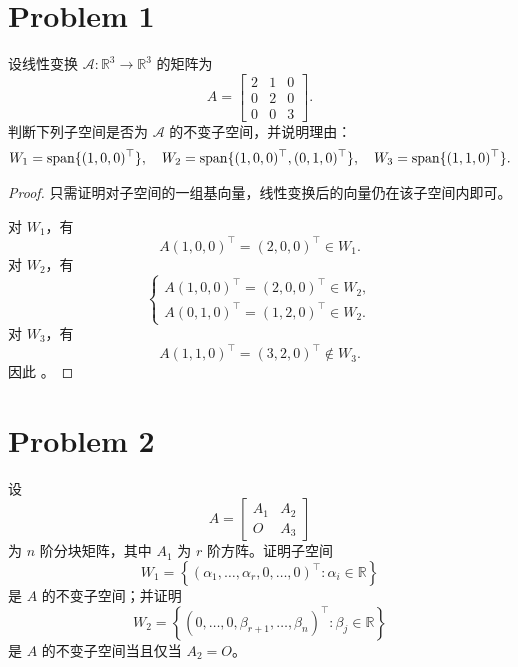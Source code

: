 \section*{Problem 1}

设线性变换 $\mathcal{A} : \mathbb{R}^3 \to \mathbb{R}^3$ 的矩阵为
\[
A =
\begin{bmatrix}
2 & 1 & 0 \\
0 & 2 & 0 \\
0 & 0 & 3
\end{bmatrix}.
\]
判断下列子空间是否为 $\mathcal{A}$ 的不变子空间，并说明理由：
\[
W_1 = \mathrm{span}\{(1,0,0)^\top\},\quad
W_2 = \mathrm{span}\{(1,0,0)^\top,(0,1,0)^\top\},\quad
W_3 = \mathrm{span}\{(1,1,0)^\top\}.
\]
\begin{proof}
只需证明对子空间的一组基向量，线性变换后的向量仍在该子空间内即可。

对 $W_1$，有
\[
A(1,0,0)^\top = (2,0,0)^\top \in W_1.
\]
对 $W_2$，有
\[
\begin{cases}
A(1,0,0)^\top = (2,0,0)^\top \in W_2, \\
A(0,1,0)^\top = (1,2,0)^\top \in W_2.
\end{cases}
\]
对 $W_3$，有
\[
A(1,1,0)^\top = (3,2,0)^\top \notin W_3.
\]
因此 。

\end{proof}

\section*{Problem 2}

设
\[
A =
\begin{bmatrix}
A_1 & A_2 \\
O & A_3
\end{bmatrix}
\]
为 $n$ 阶分块矩阵，其中 $A_1$ 为 $r$ 阶方阵。证明子空间
\[
W_1 = \left\{\left(\alpha_1,\ldots,\alpha_r,0,\ldots,0\right)^\top : \alpha_i \in \mathbb{R}\right\}
\]
是 $A$ 的不变子空间；并证明
\[
W_2 = \left\{\left(0,\ldots,0,\beta_{r+1},\ldots,\beta_n\right)^\top : \beta_j \in \mathbb{R}\right\}
\]
是 $A$ 的不变子空间当且仅当 $A_2 = O$。

